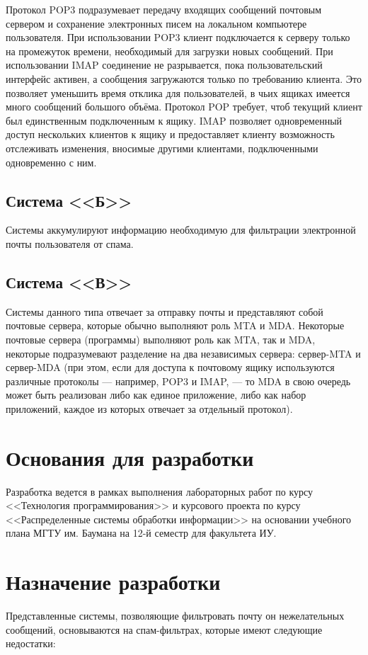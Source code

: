 Протокол POP3 подразумевает передачу входящих сообщений почтовым сервером и сохранение электронных писем на локальном компьютере пользователя. При использовании POP3 клиент подключается к серверу только на промежуток времени, необходимый для загрузки новых сообщений. При использовании IMAP соединение не разрывается, пока пользовательский интерфейс активен, а сообщения загружаются только по требованию клиента. Это позволяет уменьшить время отклика для пользователей, в чьих ящиках имеется много сообщений большого объёма.
Протокол POP требует, чтоб текущий клиент был единственным подключенным к ящику. IMAP позволяет одновременный доступ нескольких клиентов к ящику и предоставляет клиенту возможность отслеживать изменения, вносимые другими клиентами, подключенными одновременно с ним.


\subsection{Система <<Б>>}
Системы аккумулируют информацию необходимую для фильтрации электронной почты пользователя от спама.

\subsection{Система <<В>>}
 Системы данного типа отвечает за отправку почты и представляют собой почтовые сервера, которые обычно выполняют роль MTA и MDA. Некоторые почтовые сервера (программы) выполняют роль как MTA, так и MDA, некоторые подразумевают разделение на два независимых сервера: сервер-MTA и сервер-MDA (при этом, если для доступа к почтовому ящику используются различные протоколы — например, POP3 и IMAP, — то MDA в свою очередь может быть реализован либо как единое приложение, либо как набор приложений, каждое из которых отвечает за отдельный протокол).

\section{Основания для разработки}
Разработка ведется в рамках выполнения лабораторных работ по курсу <<Технология программирования>> и курсового проекта по курсу <<Распределенные системы обработки информации>> на основании учебного плана МГТУ им. Баумана на 12-й семестр для факультета ИУ.

\section{Назначение разработки}
Представленные системы, позволяющие фильтровать почту он нежелательных сообщений, основываются на спам-фильтрах, которые имеют следующие недостатки:

